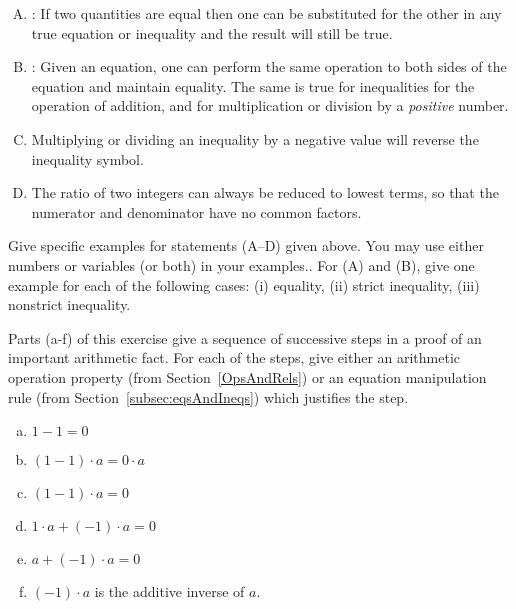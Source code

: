 \begin{enumerate}[(A)]
\item
{}: If two quantities are equal then one can be substituted for the other in any true equation or inequality and the result will still be true. 
\item
{}: Given an equation, one can perform the same operation to both sides of the equation and maintain equality.  The same is true for inequalities for the operation of addition, and for multiplication or division by a \emph{positive} number.
\item
{}
Multiplying or dividing an inequality by a negative value will reverse the inequality symbol.
\item
{}
The ratio of two integers can always be reduced to lowest terms, so that the numerator and denominator have no common factors.
\end {enumerate}

\begin{exercise}{4}
Give specific examples for statements (A--D)   given above. You may use either numbers or variables (or both) in your examples.. For (A) and (B), give one example for each of the following cases: (i) equality, (ii) strict inequality, (iii) nonstrict inequality.
\end{exercise}

\begin{exercise}{}
Parts (a-f) of this exercise give a sequence of successive steps in a proof of an important arithmetic fact. For each of the steps, give either an arithmetic operation property (from Section~\ref{OpsAndRels}) or an equation manipulation rule (from Section~\ref{subsec:eqsAndIneqs}) which justifies the step.
\begin{enumerate}[(a)]
\item
$1 -1 = 0$
\item
$(1-1)\cdot a = 0 \cdot a$
\item
$(1-1)\cdot a = 0$
\item
$1 \cdot a + (-1) \cdot a = 0$
\item
$a + (-1) \cdot a = 0$
\item
$(-1) \cdot a$ is the additive inverse of $a$.
\end{enumerate}
\end{exercise}

